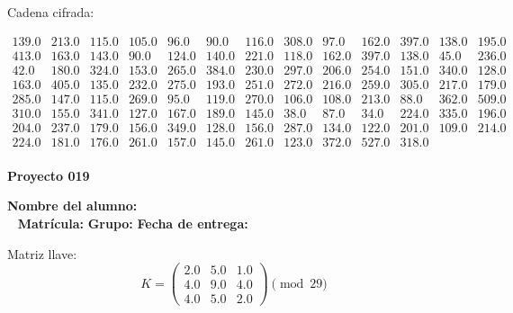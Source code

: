 \documentclass[12pt]{article}
\begin{document}
Cadena cifrada:
\begin{center}
$\begin{array}{lllllllllllll}
139.0 & 213.0 & 115.0 & 105.0 & 96.0 & 90.0 & 116.0 & 308.0 & 97.0 & 162.0 & 397.0 & 138.0 & 195.0\\
413.0 & 163.0 & 143.0 & 90.0 & 124.0 & 140.0 & 221.0 & 118.0 & 162.0 & 397.0 & 138.0 & 45.0 & 236.0\\
42.0 & 180.0 & 324.0 & 153.0 & 265.0 & 384.0 & 230.0 & 297.0 & 206.0 & 254.0 & 151.0 & 340.0 & 128.0\\
163.0 & 405.0 & 135.0 & 232.0 & 275.0 & 193.0 & 251.0 & 272.0 & 216.0 & 259.0 & 305.0 & 217.0 & 179.0\\
285.0 & 147.0 & 115.0 & 269.0 & 95.0 & 119.0 & 270.0 & 106.0 & 108.0 & 213.0 & 88.0 & 362.0 & 509.0\\
310.0 & 155.0 & 341.0 & 127.0 & 167.0 & 189.0 & 145.0 & 38.0 & 87.0 & 34.0 & 224.0 & 335.0 & 196.0\\
204.0 & 237.0 & 179.0 & 156.0 & 349.0 & 128.0 & 156.0 & 287.0 & 134.0 & 122.0 & 201.0 & 109.0 & 214.0\\
224.0 & 181.0 & 176.0 & 261.0 & 157.0 & 145.0 & 261.0 & 123.0 & 372.0 & 527.0 & 318.0\\
\end{array}$
\end{center}

\newpage


\textbf{Proyecto 019}

\textbf{Nombre del alumno:} \underline{\hspace{13cm}}\\\
\vspace{1cm}
\textbf{Matrícula:} \underline{\hspace{4cm}} \hspace{1cm}
\textbf{Grupo:} \underline{\hspace{2cm}}
\textbf{Fecha de entrega:} \underline{\hspace{2cm}}

\medskip

Matriz llave:
\[
K = \begin{pmatrix}
2.0 & 5.0 & 1.0\\
4.0 & 9.0 & 4.0\\
4.0 & 5.0 & 2.0
\end{pmatrix} \pmod{29}
\]
\end{document}
